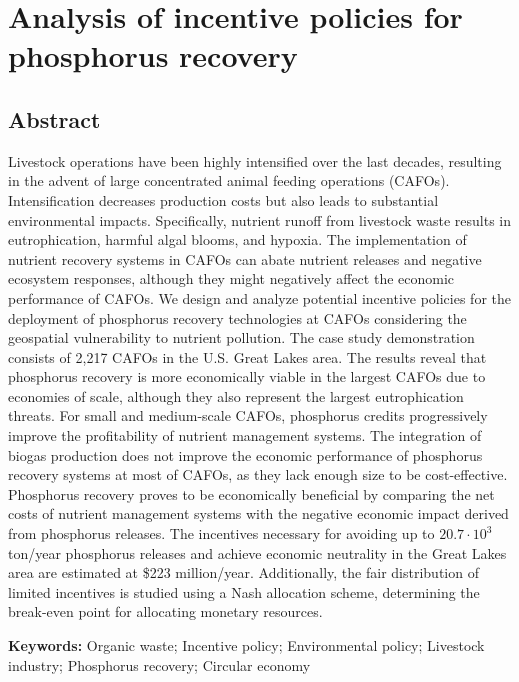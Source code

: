 \chapter{Analysis of incentive policies for phosphorus recovery}\label{ch:Policies}
\begin{refsection}[referencesCh5]
\section*{Abstract}
Livestock operations have been highly intensified over the last decades, resulting in the advent of large concentrated animal feeding operations (CAFOs). Intensification decreases production costs but also leads to substantial environmental impacts. Specifically, nutrient runoff from livestock waste results in eutrophication, harmful algal blooms, and hypoxia. The implementation of nutrient recovery systems in CAFOs can abate nutrient releases and negative ecosystem responses, although they might negatively affect the economic performance of CAFOs. We design and analyze potential incentive policies for the deployment of phosphorus recovery technologies at CAFOs considering the geospatial vulnerability to nutrient pollution. The case study demonstration consists of 2,217 CAFOs in the U.S. Great Lakes area. The results reveal that phosphorus recovery is more economically viable in the largest CAFOs due to economies of scale, although they also represent the largest eutrophication threats. For small and medium-scale CAFOs, phosphorus credits progressively improve the profitability of nutrient management systems. The integration of biogas production does not improve the economic performance of phosphorus recovery systems at most of CAFOs, as they lack enough size to be cost-effective. Phosphorus recovery proves to be economically beneficial by comparing the net costs of nutrient management systems with the negative economic impact derived from phosphorus releases. The incentives necessary for avoiding up to $20.7 \cdot 10^3$ ton/year phosphorus releases and achieve economic neutrality in the Great Lakes area are estimated at \$223 million/year. Additionally, the fair distribution of limited incentives is studied using a Nash allocation scheme, determining the break-even point for allocating monetary resources.

\bigskip
\textbf{Keywords:} Organic waste; Incentive policy; Environmental policy; Livestock industry; Phosphorus recovery; Circular economy
\newpage


\end{refsection}
